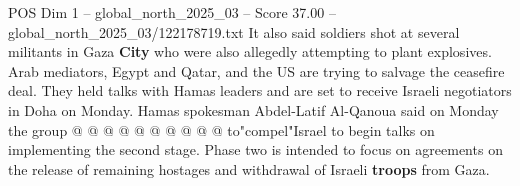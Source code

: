 \begin{textsample}{POS Dim 1 – global\_north\_2025\_03 – Score 37.00 – global\_north\_2025\_03/122178719.txt}
It also said soldiers shot at several militants in Gaza \textbf{City} who were also allegedly attempting to plant explosives.
Arab mediators, Egypt and Qatar, and the US are trying to salvage the ceasefire deal.
They held talks with Hamas leaders and are set to receive Israeli negotiators in Doha on Monday.
Hamas spokesman Abdel-Latif Al-Qanoua said on Monday the group @ @ @ @ @ @ @ @ @ @ to"compel"Israel to begin talks on implementing the second stage.
Phase two is intended to focus on agreements on the release of remaining hostages and withdrawal of Israeli \textbf{troops} from Gaza.

\end{textsample}
